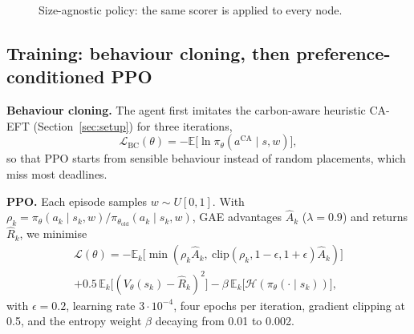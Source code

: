 \documentclass[conference]{IEEEtran}
\begin{document}
\begin{figure}[t]
\centering
{}
\caption{Size-agnostic policy: the same scorer is applied to every node.}
\label{fig:net}
\end{figure}

\subsection{Training: behaviour cloning, then preference-conditioned PPO}
\textbf{Behaviour cloning.} The agent first imitates the carbon-aware heuristic CA-EFT (Section~\ref{sec:setup}) for three iterations,
\begin{equation}
\mathcal L_{\mathrm{BC}}(\theta)=-\mathbb E\big[\ln\pi_\theta(a^{\mathrm{CA}}\mid s,w)\big], \label{eq:bc}
\end{equation}
so that PPO starts from sensible behaviour instead of random placements, which miss most deadlines.

\textbf{PPO.} Each episode samples $w\sim U[0,1]$. With $\rho_k=\pi_\theta(a_k\mid s_k,w)/\pi_{\theta_{\mathrm{old}}}(a_k\mid s_k,w)$, GAE advantages $\hat A_k$ ($\lambda=0.9$) and returns $\hat R_k$, we minimise
\begin{multline}
\mathcal L(\theta)=-\mathbb E_k\big[\min(\rho_k\hat A_k,\ \mathrm{clip}(\rho_k,1\!-\!\epsilon,1\!+\!\epsilon)\hat A_k)\big]\\
+0.5\,\mathbb E_k\big[(V_\theta(s_k)-\hat R_k)^2\big]-\beta\,\mathbb E_k\big[\mathcal H(\pi_\theta(\cdot\mid s_k))\big], \label{eq:ppo}
\end{multline}
with $\epsilon=0.2$, learning rate $3\cdot10^{-4}$, four epochs per iteration, gradient clipping at 0.5, and the entropy weight $\beta$ decaying from 0.01 to 0.002.
\end{document}
